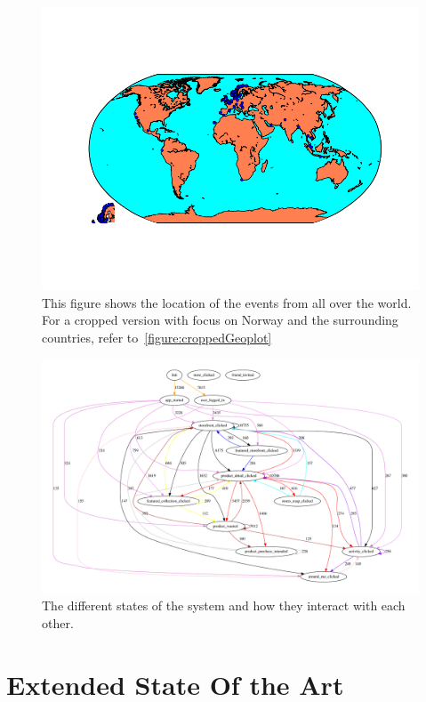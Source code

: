     \begin{figure}[H]
        \includegraphics[width=5in]{image/simpleGeoPlotworld.png}
        \centering
        \caption[Event location mapped on the world]{This figure shows the location of the events from all over the world.
        For a cropped version with focus on Norway and the surrounding countries, refer to~\ref{figure:croppedGeoplot}}
    \end{figure}

    \begin{figure}[H]
        \includegraphics[width=5in]{image/statesInteractionFalse-gvfile.pdf}
        \centering
        \caption[States in session and how they interact]{The different states of the system and how they interact with each other.}
        \label{figure:statesInteractions}
    \end{figure}

\chapter{Extended State Of the Art}
\label{app:sota}


